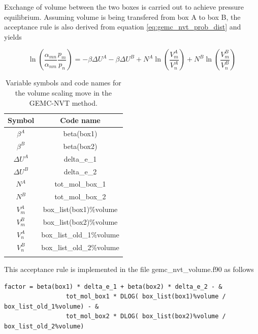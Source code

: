 Exchange of volume between the two boxes is carried out to achieve pressure equilibrium. Assuming 
volume is being transfered from box A to box B, the 
acceptance rule is also derived from equation \ref{eq:gemc_nvt_prob_dist} and yields

\begin{equation}
\ln \left( \frac{\alpha_{mn}}{\alpha_{nm}} \frac{p_m}{p_n} \right) = - \beta \Delta U^A - \beta \Delta U^B + N^A \ln\left(\frac{V^A_m}{V^A_n}\right) + N^B \ln\left(\frac{V^B_m}{V^B_n}\right)
\label{eq:gemc_nvt_volume}
\end{equation}

\begin{table}
\caption{Variable symbols and code names for the volume scaling move in the GEMC-NVT method.}
\label{table:gemc_nvt_volume}
\centering
\begin{tabular}{|c|c|} \hline
 {\bf Symbol} & {\bf Code name} \\ \hline
 $\beta^A$ & beta(box1) \\
 $\beta^B$ & beta(box2) \\
 $\Delta U^A$ & delta\_e\_1 \\
 $\Delta U^B$ & delta\_e\_2 \\
 $N^A$ & tot\_mol\_box\_1 \\
 $N^B$ & tot\_mol\_box\_2 \\
 $V^A_m$ & box\_list(box1)\%volume \\
 $V^B_m$ & box\_list(box2)\%volume \\
 $V^A_n$ & box\_list\_old\_1\%volume \\
 $V^B_n$ & box\_list\_old\_2\%volume \\
 \hline
\multicolumn{2}{c}{}
\end{tabular}
\end{table}



This acceptance rule is implemented in the file gemc\_nvt\_volume.f90 as follows

\begin{minipage}{\linewidth}
\begin{lstlisting}[firstnumber=475, caption=gemc\_nvt\_volume.f90]
factor = beta(box1) * delta_e_1 + beta(box2) * delta_e_2 - &
                 tot_mol_box1 * DLOG( box_list(box1)%volume / box_list_old_1%volume) - &
                 tot_mol_box2 * DLOG( box_list(box2)%volume / box_list_old_2%volume)

\end{lstlisting}
\end{minipage}

